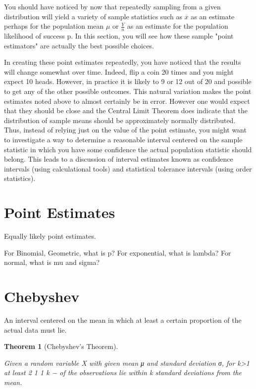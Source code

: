 \documentclass[10pt,]{book}
\theoremstyle{plain}
\newtheorem{theorem}{Theorem}[section]
\theoremstyle{definition}
\theoremstyle{definition}
\theoremstyle{definition}
\numberwithin{equation}{section}
\begin{document}
You should have noticed by now that repeatedly sampling from a given distribution will yield a variety of sample statistics such as \(\overline{x}\) as an estimate perhaps for the population mean \(\mu\) or \(\frac{Y}{n}\) as an estimate for the population likelihood of success p. In this section, you will see how these sample "point estimators" are actually the best possible choices.
%
\par

In creating these point estimates repeatedly, you have noticed that the results will change somewhat over time. Indeed, flip a coin 20 times and you might expect 10 heads. However, in practice it is likely to 9 or 12 out of 20 and possible to get any of the other possible outcomes. This natural variation makes the point estimates noted above to almost certainly be in error. However one would expect that they should be close and the Central Limit Theorem does indicate that the distribution of sample means should be approximately normally distributed. Thus, instead of relying just on the value of the point estimate, you might want to investigate a way to determine a reasonable interval centered on the sample statistic in which you have some confidence the actual population statistic should belong. This leads to a discussion of interval estimates known as confidence intervals (using calculational tools) and statistical tolerance intervals (using order statistics).
%
\typeout{************************************************}
\typeout{************************************************}
\section[{Point Estimates}]{Point Estimates}\label{section-41}

Equally likely point estimates.
%
\par

For Binomial, Geometric, what is p? For exponential, what is lambda?  For normal, what is mu and sigma?
%
\typeout{************************************************}
\typeout{************************************************}
\section[{Chebyshev}]{Chebyshev}\label{section-42}
An interval centered on the mean in which at least a certain proportion
	of the actual data must lie.
\begin{theorem}[{Chebyshev's Theorem}]\label{theorem-52}

	Given a random variable X with given mean μ and standard deviation σ, for k>1 at least
	2
	1 1
	k − of the observations lie within k standard deviations from the mean.
	\end{theorem}
\typeout{************************************************}
\typeout{************************************************}
\end{document}
